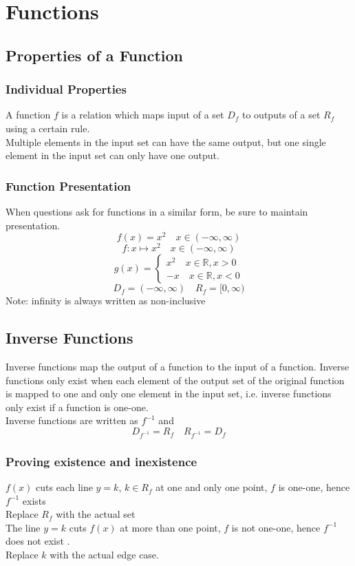 \documentclass[../main]{subfiles}
\begin{document}
\section{Functions}

\subsection{Properties of a Function}

	\subsubsection{Individual Properties}
	A function \(f\) is a relation which maps input of a set \(D_f\) to outputs of a set \(R_f\) using a certain rule. \\
	Multiple elements in the input set can have the same output, but one single element in the input set can only have one output.
	\subsubsection{Function Presentation}
	When questions ask for functions in a similar form, be sure to maintain presentation.
	\[ f(x) = x^2 \quad x \in (-\infty,\infty) \]
	\[ f: x \mapsto x^2 \quad x \in (-\infty,\infty) \]
	\begin{equation*}
		g(x)=\begin{cases}
			x^2 \quad x\in\mathbb{R}, x>0 \\
			-x \quad x\in\mathbb{R}, x<0
		\end{cases}
	\end{equation*}
	\[ D_f = (-\infty,\infty) \quad R_f = [0,\infty) \]
	Note: infinity is always written as non-inclusive

\subsection{Inverse Functions}
	Inverse functions map the output of a function to the input of a function. Inverse functions only exist when each element of the output set of the original function is mapped to one and only one element in the input set, i.e. inverse functions only exist if a function is one-one. \\ 
	Inverse functions are written as \(f^{-1}\) and 
	\[ D_{f^{-1}} = R_f \quad R_{f^{-1}} = D_f \]
	\subsubsection{Proving existence and inexistence}
	\(f(x)\) cuts each line \(y=k\), \(k\in R_f\) at one and only one point, \(f\) is one-one, hence \(f^{-1}\) exists \\
	Replace \(R_f\) with the actual set \\
	The line \(y=k\) cuts \(f(x)\) at more than one point, \(f\) is not one-one, hence \(f^{-1}\) does not exist .\\
	Replace \(k\) with the actual edge case.
\end{document}
